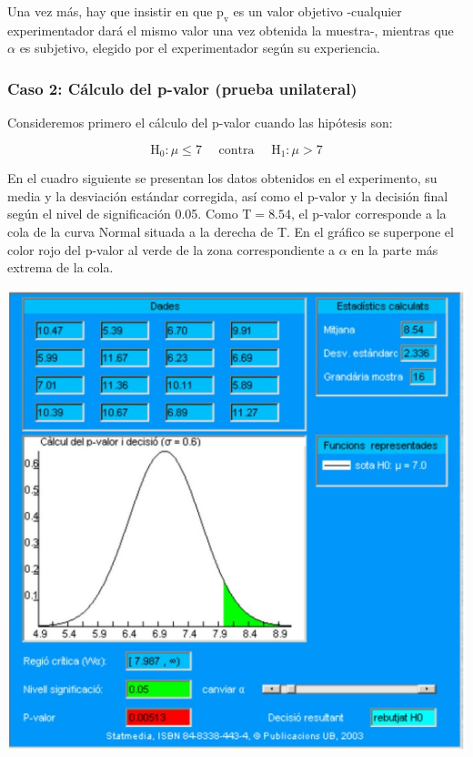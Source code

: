 \documentclass[
]{article}
\begin{document}
Una vez más, hay que insistir en que \(\mathrm{p}_{\mathrm{v}}\) es un valor objetivo -cualquier experimentador dará el mismo valor una vez obtenida la muestra-, mientras que \(\alpha\) es subjetivo, elegido por el experimentador según su experiencia.

\subsubsection{Caso 2: Cálculo del p-valor (prueba unilateral)}\label{caso-2-cuxe1lculo-del-p-valor-prueba-unilateral}

Consideremos primero el cálculo del p-valor cuando las hipótesis son:

\[
\mathrm{H}_{0}: \mu \leq 7 \quad \text { contra } \quad \mathrm{H}_{1}: \mu>7
\]

En el cuadro siguiente se presentan los datos obtenidos en el experimento, su media y la desviación estándar corregida, así como el p-valor y la decisión final según el nivel de significación 0.05. Como \(\mathrm{T}=8.54\), el p-valor corresponde a la cola de la curva Normal situada a la derecha de T. En el gráfico se superpone el color rojo del p-valor al verde de la zona correspondiente a \(\alpha\) en la parte más extrema de la cola.

\begin{center}\includegraphics[width=0.9\linewidth]{images/cap9-CalculPvalorUnilateral} \end{center}
\end{document}
